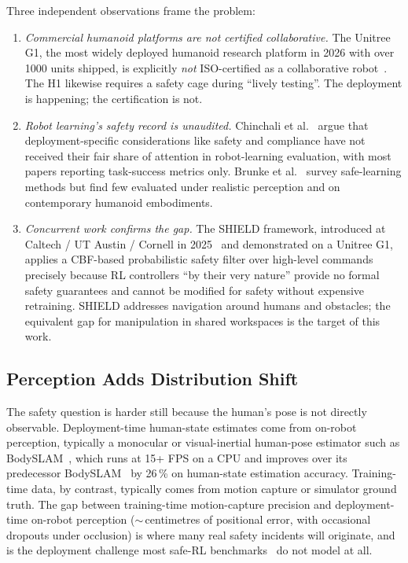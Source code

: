 \documentclass[11pt,a4paper]{report}
\newcommand{\bodyslampp}{BodySLAM\nolinebreak[4]\hspace{-.05em}\raisebox{.2ex}{\scriptsize ++}}
\begin{document}
Three independent observations frame the problem:

\begin{enumerate}[topsep=2pt,itemsep=2pt]
\item \emph{Commercial humanoid platforms are not certified
  collaborative.} The Unitree G1, the most widely deployed humanoid
  research platform in 2026 with over 1000 units shipped, is
  explicitly \emph{not} ISO-certified as a collaborative
  robot~\cite{unitree_g1}. The H1 likewise requires a safety cage
  during ``lively testing''. The deployment is happening; the
  certification is not.
\item \emph{Robot learning's safety record is unaudited.}
  Chinchali et al.~\cite{auditing2021} argue that deployment-specific
  considerations like safety and compliance have not received their
  fair share of attention in robot-learning evaluation, with most
  papers reporting task-success metrics only. Brunke et
  al.~\cite{brunke2022safelearning} survey safe-learning methods but
  find few evaluated under realistic perception and on contemporary
  humanoid embodiments.
\item \emph{Concurrent work confirms the gap.} The SHIELD framework,
  introduced at Caltech / UT Austin / Cornell in
  2025~\cite{shield2025} and demonstrated on a Unitree G1, applies a
  CBF-based probabilistic safety filter over high-level commands
  precisely because RL controllers ``by their very nature'' provide
  no formal safety guarantees and cannot be modified for safety
  without expensive retraining. SHIELD addresses navigation around
  humans and obstacles; the equivalent gap for manipulation in
  shared workspaces is the target of this work.
\end{enumerate}

\subsection{Perception Adds Distribution Shift}
\label{sec:intro:mot:perception}

The safety question is harder still because the human's pose is not
directly observable. Deployment-time human-state estimates come from
on-robot perception, typically a monocular or visual-inertial
human-pose estimator such as \bodyslampp{}~\cite{henning2023bodyslampp},
which runs at 15+ FPS on a CPU and improves over its predecessor
BodySLAM~\cite{henning2022bodyslam} by 26\,\% on human-state
estimation accuracy. Training-time data, by contrast, typically
comes from motion capture or simulator ground truth.
The gap between training-time motion-capture precision and
deployment-time on-robot perception ($\sim$\,centimetres of
positional error, with occasional dropouts under occlusion) is where
many real safety incidents will originate, and is the deployment
challenge most safe-RL benchmarks~\cite{ray2019safetygym,
ji2023safetygymnasium,yuan2022safecontrolgym} do not model at all.
\end{document}
